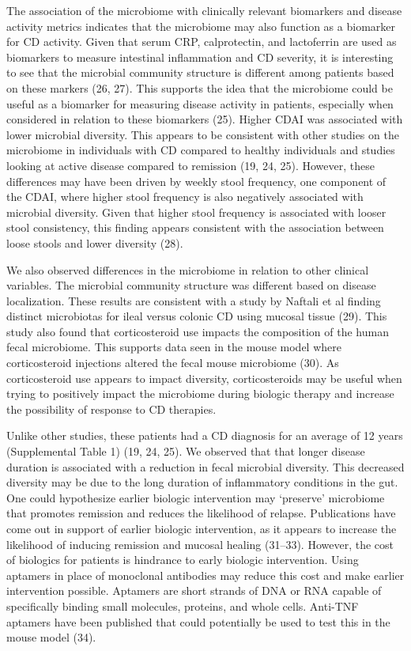 \documentclass[11pt,]{article}
\begin{document}
The association of the microbiome with clinically relevant biomarkers
and disease activity metrics indicates that the microbiome may also
function as a biomarker for CD activity. Given that serum CRP,
calprotectin, and lactoferrin are used as biomarkers to measure
intestinal inflammation and CD severity, it is interesting to see that
the microbial community structure is different among patients based on
these markers (26, 27). This supports the idea that the microbiome could
be useful as a biomarker for measuring disease activity in patients,
especially when considered in relation to these biomarkers (25). Higher
CDAI was associated with lower microbial diversity. This appears to be
consistent with other studies on the microbiome in individuals with CD
compared to healthy individuals and studies looking at active disease
compared to remission (19, 24, 25). However, these differences may have
been driven by weekly stool frequency, one component of the CDAI, where
higher stool frequency is also negatively associated with microbial
diversity. Given that higher stool frequency is associated with looser
stool consistency, this finding appears consistent with the association
between loose stools and lower diversity (28).

We also observed differences in the microbiome in relation to other
clinical variables. The microbial community structure was different
based on disease localization. These results are consistent with a study
by Naftali et al finding distinct microbiotas for ileal versus colonic
CD using mucosal tissue (29). This study also found that corticosteroid
use impacts the composition of the human fecal microbiome. This supports
data seen in the mouse model where corticosteroid injections altered the
fecal mouse microbiome (30). As corticosteroid use appears to impact
diversity, corticosteroids may be useful when trying to positively
impact the microbiome during biologic therapy and increase the
possibility of response to CD therapies.

Unlike other studies, these patients had a CD diagnosis for an average
of 12 years (Supplemental Table 1) (19, 24, 25). We observed that that
longer disease duration is associated with a reduction in fecal
microbial diversity. This decreased diversity may be due to the long
duration of inflammatory conditions in the gut. One could hypothesize
earlier biologic intervention may `preserve' microbiome that promotes
remission and reduces the likelihood of relapse. Publications have come
out in support of earlier biologic intervention, as it appears to
increase the likelihood of inducing remission and mucosal healing
(31--33). However, the cost of biologics for patients is hindrance to
early biologic intervention. Using aptamers in place of monoclonal
antibodies may reduce this cost and make earlier intervention possible.
Aptamers are short strands of DNA or RNA capable of specifically binding
small molecules, proteins, and whole cells. Anti-TNF aptamers have been
published that could potentially be used to test this in the mouse model
(34).
\end{document}
